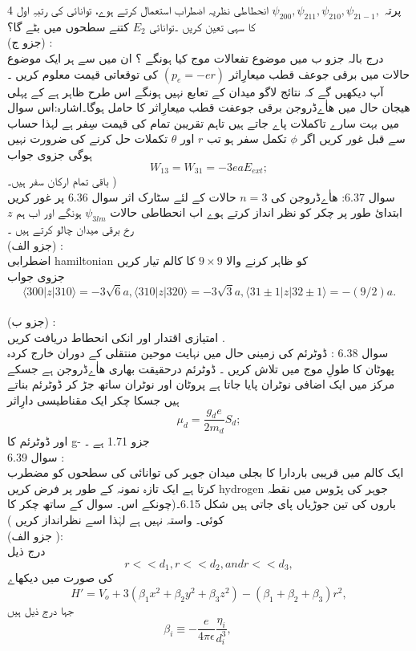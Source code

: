\documentclass{book}
\begin{document}
4
پرتہ
\(\psi_{200},\psi_{211},\psi_{210},\psi_{21-1},\)
انحطاطی نظریہ اضطراب استعمال کرتے ہوے، توانائی کی رتبہِ اول کا سہی تعین کریں ۔توانائی 
\(E_{2}\)
کتنے سطحوں میں بٹے گا؟\\
(جزو ج) :\\
 درج بالہ جزو ب میں موضوع تفعالات موج کیا ہونگے ؟ ان میں سے ہر ایک موضوع حالات میں برقی جوعف قطب میعارِاثر
\((p_{e}=-er)\)
کی توقعاتی قیمت معلوم کریں ۔ آپ دیکھیں گے کہ نتائج  لاگو میدان کے تعابع نہیں ہونگے اس طرح ظاہر ہے کے پہلی هیجان حال میں ھاٰےڈروجن برقی جوعفت قطب میعارِاثر کا حامل ہوگا۔اشارہ:اس سوال میں بہت سارے تاكملات پاے جاتے ہیں تاہم تقریبن تمام کی قیمت سِفر ہے لہذا حساب سے قبل غور کریں اگر 
\(\phi\)
تكمل سفر ہو تب 
\(r\)
اور 
\(\theta\)
تکملات حل کرنے  کی ضرورت نہیں ہوگی جزوی جواب
\[W_{13}=W_{31}=-3eaE_{ext};\]
باقی تمام ارکان سفر ہیں۔ )\\
سوال 6.37:
 ھاٰےڈروجن کی 
\(n=3\)
حالات کے لئے سٹارک  اثر سوال 6.36 پر غور کریں ابتدائ طور پر چکر کو نظر انداز کرتے ہوے اب انحطاطی حالات 
\(\psi_{3lm}\)
ہونگے اور اب ہم 
\(z\)
رخ برقی میدان چالو کرتے ہیں ۔\\
(جزو الف) :\\ 
اضطرابی hamiltonian کو ظاہر کرنے والا 
\(9\times9\)
کا کالم  تیار کریں\\
 جزوی جواب 
\[\langle 300|z|310\rangle =-3\sqrt{6}a,\langle 310|z|320\rangle =-3\sqrt{3}a,\langle 31\pm1|z|32\pm1\rangle=-(9/2)a.\]\\
(جزو ب) :\\ 
امتیازی اقتدار اور انکی انحطاط دریافت کریں .\\
سوال 6.38 :
  ڈوٹرئم
کی زمینی حال میں نہایت موحین منتقلی کے دوران خارج کردہ پھوٹان کا طولِ موج
میں تلاش کریں ۔ ڈوٹرئم درحقیقت بھاری ھاٰےڈروجن ہے جسکے مرکز میں ایک اضافی نوٹران پایا جاتا ہے پروٹان اور نوٹران ساتھ جڑ کر  ڈوٹرئم بناتے ہیں جسکا چکر ایک مقناطیسی دارِاثر
\[\mu_{d}=\frac{g_{d}e}{2m_{d}}S_{d};\]
اور ڈوٹرئم کا 
g-
جزو 1.71 ہے ۔\\
سوال 6.39 :\\
 ایک کالم میں قریبی باردارا کا بجلی میدان جوہر کی توانائی کی سطحوں کو مضطرب کرتا ہے ایک تازہ نمونہ کے طور پر فرض کریں hydrogen جوہر کی پڑوس میں نقطہ باروں کی تین جوڑیاں پای جاتی ہیں شکل 6.15۔(چونکے اس۔ سوال کے ساتھ چکر کا کوئی۔ واستہ نہیں ہے لہٰذا اسے نظرانداز کریں )\\
(جزو الف ):\\
 درج ذیل 
\[r<<d_{1},r<<d_{2},andr<<d_{3},\]
کی صورت میں دیکھاے
\[H'=V_{o}+3(\beta_{1}x^{2}+\beta_{2}y^{2}+\beta_{3}z^{2})-(\beta_{1}+\beta_{2}+\beta_{3})r^{2},\]
جہا درج ذیل ہیں
\[\beta_{i}\equiv-\frac{e}{4\pi\epsilon}\frac{\eta_{i}}{d_{i}^{3}},\quad\quad\]
\end{document}
